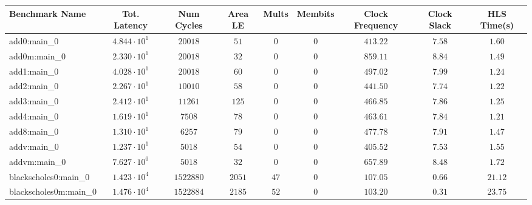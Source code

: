 \begin{tabular}{|l|c|c|c|c|c|c|c|c|}
\hline
Benchmark Name                 & Tot. Latency           & Num Cycles   & Area LE    & Mults    & Membits      & Clock Frequency & Clock Slack & HLS Time(s) \\
\hline
add0:main\_0                   & $ 4.844 \cdot 10^{1} $ & $ 20018    $ & $ 51     $ & $ 0    $ & $ 0        $ & $ 413.22      $ & $ 7.58    $ & $ 1.60    $ \\
add0m:main\_0                  & $ 2.330 \cdot 10^{1} $ & $ 20018    $ & $ 32     $ & $ 0    $ & $ 0        $ & $ 859.11      $ & $ 8.84    $ & $ 1.49    $ \\
add1:main\_0                   & $ 4.028 \cdot 10^{1} $ & $ 20018    $ & $ 60     $ & $ 0    $ & $ 0        $ & $ 497.02      $ & $ 7.99    $ & $ 1.24    $ \\
add2:main\_0                   & $ 2.267 \cdot 10^{1} $ & $ 10010    $ & $ 58     $ & $ 0    $ & $ 0        $ & $ 441.50      $ & $ 7.74    $ & $ 1.22    $ \\
add3:main\_0                   & $ 2.412 \cdot 10^{1} $ & $ 11261    $ & $ 125    $ & $ 0    $ & $ 0        $ & $ 466.85      $ & $ 7.86    $ & $ 1.25    $ \\
add4:main\_0                   & $ 1.619 \cdot 10^{1} $ & $ 7508     $ & $ 78     $ & $ 0    $ & $ 0        $ & $ 463.61      $ & $ 7.84    $ & $ 1.21    $ \\
add8:main\_0                   & $ 1.310 \cdot 10^{1} $ & $ 6257     $ & $ 79     $ & $ 0    $ & $ 0        $ & $ 477.78      $ & $ 7.91    $ & $ 1.47    $ \\
addv:main\_0                   & $ 1.237 \cdot 10^{1} $ & $ 5018     $ & $ 54     $ & $ 0    $ & $ 0        $ & $ 405.52      $ & $ 7.53    $ & $ 1.55    $ \\
addvm:main\_0                  & $ 7.627 \cdot 10^{0} $ & $ 5018     $ & $ 32     $ & $ 0    $ & $ 0        $ & $ 657.89      $ & $ 8.48    $ & $ 1.72    $ \\
blackscholes0:main\_0          & $ 1.423 \cdot 10^{4} $ & $ 1522880  $ & $ 2051   $ & $ 47   $ & $ 0        $ & $ 107.05      $ & $ 0.66    $ & $ 21.12   $ \\
blackscholes0m:main\_0         & $ 1.476 \cdot 10^{4} $ & $ 1522884  $ & $ 2185   $ & $ 52   $ & $ 0        $ & $ 103.20      $ & $ 0.31    $ & $ 23.75   $ \\

\end{tabular}
